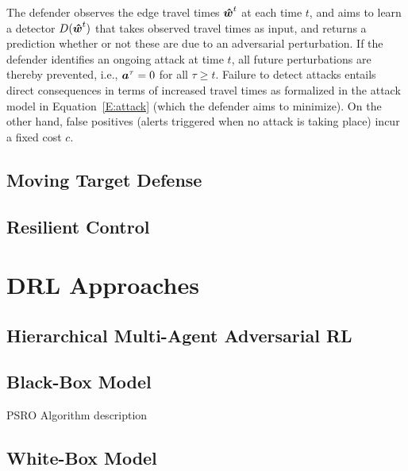 The defender observes the edge travel times $\boldsymbol{\hat{w}}^t$ at each time $t$, and aims to learn a detector $D(\boldsymbol{\hat{w}}^t)$ that takes observed travel times as input, and returns a prediction whether or not these are due to an adversarial perturbation.
If the defender identifies an ongoing attack at time $t$, all future perturbations are thereby prevented, i.e., $\boldsymbol{a}^\tau = 0$ for all $\tau \geq t$.
Failure to detect attacks entails direct consequences in terms of increased travel times as formalized in the attack model in Equation~\eqref{E:attack} (which the defender aims to minimize).
On the other hand, false positives (alerts triggered when no attack is taking place) incur a fixed cost $c$.


\subsection{Moving Target Defense}

\subsection{Resilient Control}


\section{DRL Approaches}

\subsection{Hierarchical Multi-Agent Adversarial RL}

\subsection{Black-Box Model}

PSRO Algorithm description

\subsection{White-Box Model}